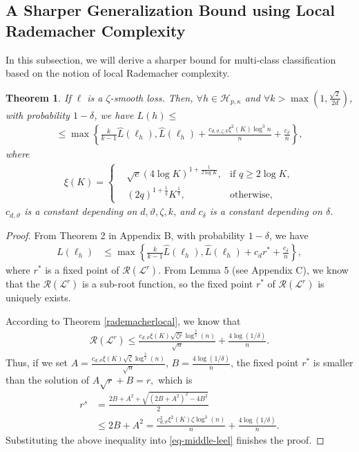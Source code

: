 \documentclass{article}
\newtheorem{theorem}{Theorem}
\begin{document}
\subsection{A Sharper Generalization Bound using Local Rademacher Complexity}
In this subsection, we will derive a sharper bound for multi-class classification based on
the notion of local Rademacher complexity.
\begin{theorem}
\label{theorem-finally}
  If $\ell$ is a $\zeta$-smooth loss.
  Then, $\forall h\in\mathcal{H}_{p,\kappa}$ and $\forall k>\max(1,\frac{\sqrt{2}}{2d})$,  with probability
  $1-\delta$, we have $L(h)\leq $
  \begin{align*}
   \leq \max\left\{
        \frac{k}{k-1}\hat{L}(\ell_h),
       \hat{L}(\ell_h)+\frac{c_{d,\vartheta,\zeta, k}\xi^2(K) \log^3 n}{n}+\frac{c_{\delta}}{n}
     \right\},
\end{align*}
where \begin{align*}
  \xi(K)=
  \left\{
      \begin{aligned}
      &\sqrt{e}(4\log K)^{1+\frac{1}{2\log K}}, &\text{if } q\geq 2\log K,\\
      &(2q)^{1+\frac{1}{q}}K^{\frac{1}{q}}, &\text{otherwise},
      \end{aligned}
      \right.
  \end{align*}
  $c_{d,\vartheta}$ is a constant depending on $d,\vartheta,\zeta, k$,
  and $c_{\delta}$ is a constant depending on $\delta$.
\end{theorem}
\begin{proof}
From Theorem 2 in Appendix B,
with probability $1-\delta$,
we have
\begin{align}
\label{eq-middle-leel}
   L(\ell_h)&\leq \max\left\{
        \frac{k}{k-1}\hat{L}(\ell_h),
       \hat{L}(\ell_h)+c_dr^\ast+\frac{c_\delta}{n}
     \right\},
\end{align}
where $r^\ast$ is a fixed point of $\mathcal{R}(\mathcal{L}^r)$.
From Lemma 5 (see  Appendix C),
we know that the $\mathcal{R}(\mathcal{L}^r)$ is a sub-root function,
so the fixed point $r^\ast$ of $\mathcal{R}(\mathcal{L}^r)$ is uniquely exists.

According to  Theorem \ref{rademacherlocal}, we know that
\begin{align*}
    \mathcal{R}(\mathcal{L}^r) \leq \frac{c_{d,\vartheta}\xi(K)\sqrt{\zeta r}\log^{\frac{3}{2}}(n)}{\sqrt{n}}+\frac{4\log(1/\delta)}{n}.
  \end{align*}
Thus, if we set $A=\frac{c_{d,\vartheta}\xi(K)\sqrt{\zeta}\log^{\frac{3}{2}}(n)}{\sqrt{n}}$, $B=\frac{4\log(1/\delta)}{n}$,
the fixed point $r^\ast$ is smaller than the solution of
  $
     A\sqrt{r}+B=r,
  $
   which is
   \begin{align*}
     r^s&=\frac{2B+A^2+\sqrt{(2B+A^2)^2-4B^2}}{2}\\
     &\leq 2B+A^2
     =\frac{c_{d,\vartheta}^2\xi^2(K)\zeta\log^3(n)}{n}+\frac{4\log(1/\delta)}{n}.
   \end{align*}
   Substituting the above inequality into \eqref{eq-middle-leel} finishes the proof.
\end{proof}
\end{document}
